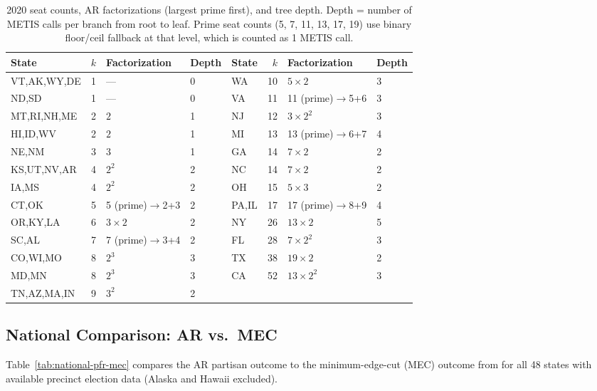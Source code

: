 \begin{table}[h]
\centering\small
\begin{tabular}{lrll|lrll}
\toprule
State & $k$ & Factorization & Depth &
State & $k$ & Factorization & Depth \\
\midrule
VT,AK,WY,DE  & 1  & ---          & 0 & WA & 10 & $5 \times 2$        & 3 \\
ND,SD         & 1  & ---          & 0 & VA & 11 & 11 (prime)$\to$5+6  & 3 \\
MT,RI,NH,ME  & 2  & $2$          & 1 & NJ & 12 & $3\times 2^2$       & 3 \\
HI,ID,WV     & 2  & $2$          & 1 & MI & 13 & 13 (prime)$\to$6+7  & 4 \\
NE,NM        & 3  & $3$          & 1 & GA & 14 & $7\times 2$         & 2 \\
KS,UT,NV,AR  & 4  & $2^2$        & 2 & NC & 14 & $7\times 2$         & 2 \\
IA,MS        & 4  & $2^2$        & 2 & OH & 15 & $5\times 3$         & 2 \\
CT,OK        & 5  & 5 (prime)$\to$2+3 & 2 & PA,IL & 17 & 17 (prime)$\to$8+9 & 4 \\
OR,KY,LA     & 6  & $3\times 2$  & 2 & NY & 26 & $13\times 2$        & 5 \\
SC,AL        & 7  & 7 (prime)$\to$3+4 & 2 & FL & 28 & $7\times 2^2$  & 3 \\
CO,WI,MO     & 8  & $2^3$        & 3 & TX & 38 & $19\times 2$        & 2 \\
MD,MN        & 8  & $2^3$        & 3 & CA & 52 & $13\times 2^2$      & 3 \\
TN,AZ,MA,IN  & 9  & $3^2$        & 2 & & & & \\
\bottomrule
\end{tabular}
\caption{2020 seat counts, AR factorizations (largest prime first), and tree depth.
  Depth = number of METIS calls per branch from root to leaf.
  Prime seat counts (5, 7, 11, 13, 17, 19) use binary floor/ceil fallback at
  that level, which is counted as 1 METIS call.}
\label{tab:factorizations}
\end{table}

\subsection{National Comparison: AR vs.\ MEC}
\label{sec:eval:national}

Table~\ref{tab:national-pfr-mec} compares the AR partisan outcome to the
minimum-edge-cut (MEC) outcome from \citet{dellaLibera2026mec} for all 48
states with available precinct election data (Alaska and Hawaii excluded).

